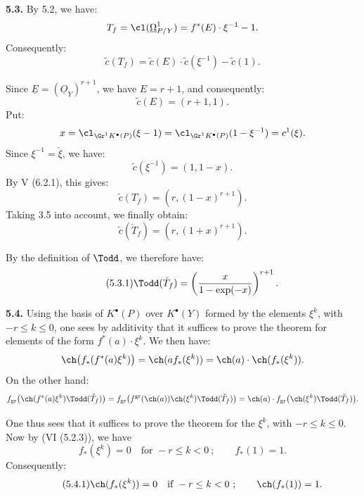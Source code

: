 \textbf{5.3.} By 5.2, we have:
\[
 T_f=\cl(\underline{\Omega}^1_{P/Y})=f^*(E)\cdot\xi^{-1}-1.
\]
Consequently:
\[
 \widetilde c(T_f)=\widetilde c(E)\cdot\widetilde c(\xi^{-1})-\widetilde c(1).
\]

%
Since \(\underline{E}=(\underline{O}_Y)^{r+1}\), we have \(E=r+1\), and consequently:
\[
 \widetilde c(E)=(r+1,1).
\]
Put:
\[
 x=\cl_{\Gr^1K^{\bullet}(P)}(\xi-1)
 =
 \cl_{\Gr^1K^{\bullet}(P)}(1-\xi^{-1})
 =
 c^1(\xi).
\]
Since \(\xi^{-1}=\check \xi\), we have:
\[
 \widetilde c(\xi^{-1})=(1,1-x).
\]
By V (6.2.1), this gives:
\[
 \widetilde c(T_f)=(r,(1-x)^{r+1}).
\]
Taking 3.5 into account, we finally obtain:
\[
 \widetilde c(\check T_f)=(r,(1+x)^{r+1}).
\]

By the definition of \(\Todd\), we therefore have:
\begin{equation}\tag{5.3.1}
 \Todd(\check T_f)=
 \left(\frac{x}{1-\exp(-x)}\right)^{r+1}.
\end{equation}

\textbf{5.4.} Using the basis of \(K^{\bullet}(P)\) over \(K^{\bullet}(Y)\) formed by the elements \(\xi^k\), with \(-r\leq k\leq0\), one sees by additivity that it suffices to prove the theorem for elements of the form \(f^*(a)\cdot\xi^k\). We then have:
\[
 \ch\bigl(f_*(f^*(a)\xi^k)\bigr)
 =
 \ch(a f_*(\xi^k))
 =
 \ch(a)\cdot\ch(f_*(\xi^k)).
\]
On the other hand:
\[
 f_{\mathrm{gr}}\bigl(\ch(f^*(a)\xi^k)\Todd(\check T_f)\bigr)
 =
 f_{\mathrm{gr}}\bigl(f^{\mathrm{gr}}(\ch(a))\ch(\xi^k)\Todd(\check T_f)\bigr)
 =
 \ch(a)\cdot f_{\mathrm{gr}}\bigl(\ch(\xi^k)\Todd(\check T_f)\bigr).
\]

One thus sees that it suffices to prove the theorem for the \(\xi^k\), with \(-r\leq k\leq0\). Now by (VI (5.2.3)), we have
\[
 f_*(\xi^k)=0\quad\text{for }-r\leq k<0~;\qquad f_*(1)=1.
\]
Consequently:
\begin{equation}\tag{5.4.1}
 \ch(f_*(\xi^k))=0\quad\text{if }-r\leq k<0~;\qquad
 \ch(f_*(1))=1.
\end{equation}

